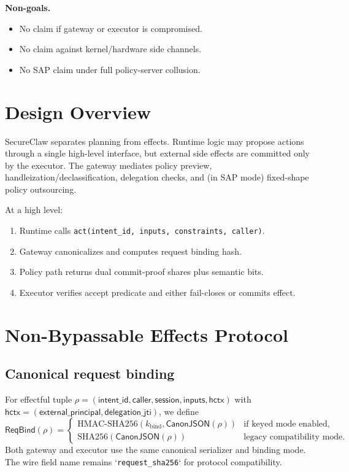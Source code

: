 \textbf{Non-goals.}
\begin{itemize}
  \item No claim if gateway or executor is compromised.
  \item No claim against kernel/hardware side channels.
  \item No SAP claim under full policy-server collusion.
\end{itemize}

\section{Design Overview}
\label{sec:overview}

SecureClaw separates planning from effects.
Runtime logic may propose actions through a single high-level interface, but external side effects are committed only by the executor.
The gateway mediates policy preview, handleization/declassification, delegation checks, and (in SAP mode) fixed-shape policy outsourcing.

At a high level:
\begin{enumerate}
  \item Runtime calls \texttt{act(intent\_id, inputs, constraints, caller)}.
  \item Gateway canonicalizes and computes request binding hash.
  \item Policy path returns dual commit-proof shares plus semantic bits.
  \item Executor verifies accept predicate and either fail-closes or commits effect.
\end{enumerate}

\section{Non-Bypassable Effects Protocol}
\label{sec:nbe}

\subsection{Canonical request binding}

For effectful tuple
$\rho=(\mathsf{intent\_id},\mathsf{caller},\mathsf{session},\mathsf{inputs},\mathsf{hctx})$
with
$\mathsf{hctx}=(\mathsf{external\_principal},\mathsf{delegation\_jti})$,
we define
\[
\mathsf{ReqBind}(\rho)=
\begin{cases}
\mathrm{HMAC\mbox{-}SHA256}(k_{\mathrm{bind}},\mathsf{CanonJSON}(\rho)) & \text{if keyed mode enabled},\\
\mathrm{SHA256}(\mathsf{CanonJSON}(\rho)) & \text{legacy compatibility mode}.
\end{cases}
\]
Both gateway and executor use the same canonical serializer and binding mode. The wire field name remains
`\texttt{request\_sha256}` for protocol compatibility.

